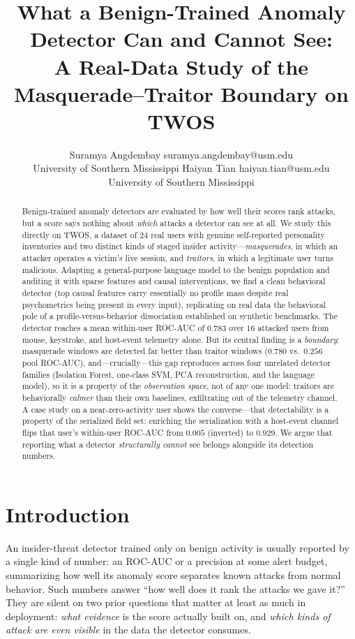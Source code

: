 \documentclass[10pt]{article}
\title{What a Benign-Trained Anomaly Detector Can and Cannot See:\\
A Real-Data Study of the Masquerade--Traitor Boundary on TWOS}
\author{\name Suramya Angdembay \email suramya.angdembay@usm.edu \\
\addr University of Southern Mississippi
\AND
\name Haiyan Tian \email haiyan.tian@usm.edu \\
\addr University of Southern Mississippi}
\begin{document}
\maketitle

\begin{abstract}
Benign-trained anomaly detectors are evaluated by how well their scores rank
attacks, but a score says nothing about \emph{which} attacks a detector can
see at all. We study this directly on TWOS, a dataset of $24$ real users with
genuine self-reported personality inventories and two distinct kinds of staged
insider activity---\emph{masquerades}, in which an attacker operates a
victim's live session, and \emph{traitors}, in which a legitimate user turns
malicious. Adapting a general-purpose language model to the benign population
and auditing it with sparse features and causal interventions, we find a clean
behavioral detector (top causal features carry essentially no profile mass
despite real psychometrics being present in every input), replicating on real
data the behavioral pole of a profile-versus-behavior dissociation established
on synthetic benchmarks. The detector reaches a mean within-user ROC-AUC of
$0.783$ over $16$ attacked users from mouse, keystroke, and host-event
telemetry alone. But its central finding is a \emph{boundary}: masquerade
windows are detected far better than traitor windows
($0.780$ vs.\ $0.256$ pool ROC-AUC), and---crucially---this gap reproduces
across four unrelated detector families (Isolation Forest, one-class SVM,
PCA reconstruction, and the language model), so it is a property of the
\emph{observation space}, not of any one model: traitors are behaviorally
\emph{calmer} than their own baselines, exfiltrating out of the telemetry
channel. A case study on a near-zero-activity user shows the converse---that
detectability is a property of the serialized field set: enriching the
serialization with a host-event channel flips that user's within-user ROC-AUC
from $0.005$ (inverted) to $0.929$. We argue that reporting what a detector
\emph{structurally cannot} see belongs alongside its detection numbers.
\end{abstract}

\section{Introduction}

An insider-threat detector trained only on benign activity is usually reported
by a single kind of number: an ROC-AUC or a precision at some alert budget,
summarizing how well its anomaly score separates known attacks from normal
behavior. Such numbers answer ``how well does it rank the attacks we gave
it?'' They are silent on two prior questions that matter at least as much in
deployment: \emph{what evidence} is the score actually built on, and \emph{which
kinds of attack are even visible} in the data the detector consumes.
\end{document}
